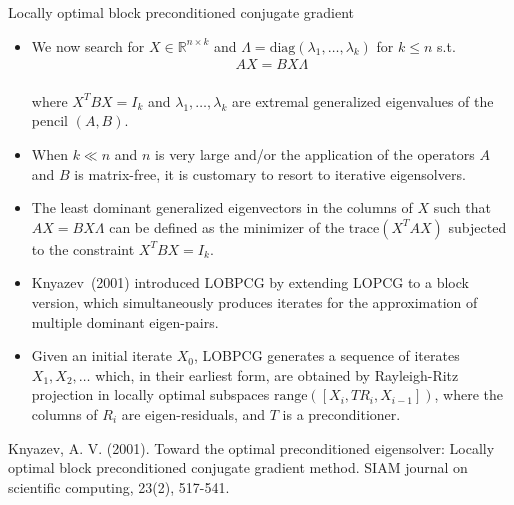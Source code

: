 \documentclass[t,usepdftitle=false]{beamer}
\begin{document}
\begin{frame}{Locally optimal block preconditioned conjugate gradient}
	\begin{itemize}
	\item We now search for $X\in\mathbb{R}^{n\times k}$ and $\Lambda=\mathrm{diag}(\lambda_1,\dots,\lambda_k)$ for $k\leq n$ s.t.\vspace{-.1cm}
	\begin{align*}AX=BX\Lambda\end{align*}
	\vspace{-.7cm}\\
	where $X^TBX=I_k$ and $\lambda_1,\dots,\lambda_k$ are extremal generalized eigenvalues of the pencil $(A,B)$.
	\item When $k\ll n$ and $n$ is very large  and/or the application of the operators $A$ and $B$ is matrix-free, it is customary to resort to iterative eigensolvers.\\
	\item The least dominant generalized eigenvectors in the columns of $X$ such that $AX=BX\Lambda$ can be defined as the minimizer of the $\text{trace}(X^TAX)$ subjected to the constraint $X^TBX=I_k$.
	\item Knyazev~(2001) introduced LOBPCG by extending LOPCG to a block version, which simultaneously produces iterates for the approximation of multiple dominant eigen-pairs.
	\item Given an initial iterate $X_0$, LOBPCG generates a sequence of iterates $X_1,X_2,\dots$ which, in their earliest form, are obtained by Rayleigh-Ritz projection in locally optimal subspaces $\text{range}([X_{i},TR_i,X_{i-1}])$, where the columns of $R_i$ are eigen-residuals, and $T$ is a preconditioner.
	\end{itemize}
	\medskip
	\tiny{Knyazev, A. V. (2001). Toward the optimal preconditioned eigensolver: Locally optimal block preconditioned conjugate gradient method. SIAM journal on scientific computing, 23(2), 517-541.}
\end{frame}
\end{document}
